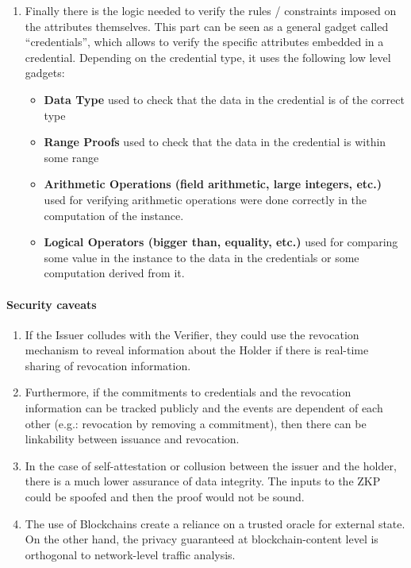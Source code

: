 \begin{enumerate}
\item Finally there is the logic needed to verify the rules / constraints imposed on the attributes themselves. This part can be seen as a general gadget called “credentials”, which allows to verify the specific attributes embedded in a credential. Depending on the 	credential type, it uses the following low level gadgets:	
		\begin{itemize}
		\item \textbf{Data Type} used to check that the data in the credential is of the correct type 	
		\item \textbf{Range Proofs} used to check that the data in the credential is within some range
		\item \textbf{Arithmetic Operations (field arithmetic, large integers, etc.)} used for verifying arithmetic operations were done correctly in the computation of the instance.
		\item \textbf{Logical Operators (bigger than, equality, etc.)} used for comparing some value in the instance to the data in the credentials or some computation derived from it.
		\end{itemize}
\end{enumerate}



\paragraph{Security caveats}

\begin{enumerate}
	\item If the Issuer colludes with the Verifier, they could use the revocation mechanism to reveal information about the Holder if there is real-time sharing of revocation information.
	\item Furthermore, if the commitments to credentials and the revocation 	information can be tracked publicly and the events are dependent of each other (e.g.: revocation by removing a commitment), then there can be linkability between issuance and revocation.	
	\item In the case of self-attestation or collusion between the issuer and the holder, there is a much lower assurance of data integrity. The inputs to the ZKP could be spoofed and then the proof would not be sound.
	\item The use of Blockchains create a reliance on a trusted oracle for external state. On the other hand, the privacy guaranteed at blockchain-content level is orthogonal to network-level traffic analysis.	
\end{enumerate}



